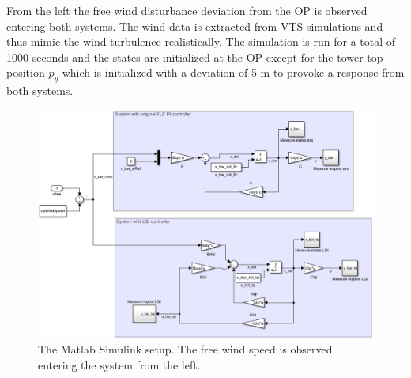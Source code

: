 From the left the free wind disturbance deviation from the OP is observed entering both systems. The wind data is extracted from VTS simulations and thus mimic the wind turbulence realistically. The simulation is run for a total of 1000 seconds and the states are initialized at the OP except for the tower top position $ p_y $ which is initialized with a deviation of 5 m to provoke a response from both systems.
\begin{figure}[ht]
	\centering
	\includegraphics[width=0.95\linewidth]{Graphics/TestResults/linearModPerf/simulink_setup2.png}
	\caption{The Matlab Simulink setup. The free wind speed is observed entering the system from the left.}
	\label{fig:app_simulink_setup2}
\end{figure}


